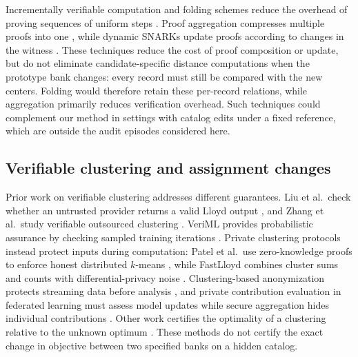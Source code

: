 \documentclass[5p,times,twocolumn]{elsarticle}
\begin{document}
Incrementally verifiable computation and folding schemes reduce
the overhead of proving sequences of uniform steps
\cite{kothapalli2022nova,kothapalli2024hypernova,bunz2023protostar}.
Proof aggregation compresses multiple proofs into one
\cite{gailly2022snarkpack}, while dynamic SNARKs update proofs
according to changes in the witness
\cite{wang2024dynamic,zhang2026dynark}. These techniques reduce
the cost of proof composition or update, but do not eliminate
candidate-specific distance computations when the prototype
bank changes: every record must still be compared with the new
centers. Folding would therefore retain these per-record
relations, while aggregation primarily reduces verification
overhead. Such techniques could complement our method in
settings with catalog edits under a fixed reference, which are
outside the audit episodes considered here.

\subsection{Verifiable clustering and assignment changes}
\label{sec:rw-clustering}

Prior work on verifiable clustering addresses different
guarantees. Liu et al.\ check whether an untrusted provider
returns a valid Lloyd output \cite{liu2013integrity}, and
Zhang et al.\ study verifiable outsourced clustering
\cite{zhang2021verifiable}. VeriML provides probabilistic
assurance by checking sampled training iterations
\cite{zhao2019veriml}. Private clustering protocols instead
protect inputs during computation: Patel et al.\ use
zero-knowledge proofs to enforce honest distributed $k$-means
\cite{patel2013clustering}, while FastLloyd combines cluster
sums and counts with differential-privacy noise
\cite{diaa2025fastlloyd}. Clustering-based anonymization protects streaming data before analysis
\cite{sadeghinasab2023flink}, and private contribution evaluation in
federated learning must assess model updates while secure aggregation
hides individual contributions \cite{jaramillovelez2026beyond}. Other work certifies the optimality
of a clustering relative to the unknown optimum
\cite{iguchi2016certifiably,mixon2017certificates,clum2024sketch}.
These methods do not certify the exact change in objective
between two specified banks on a hidden catalog.
\end{document}
